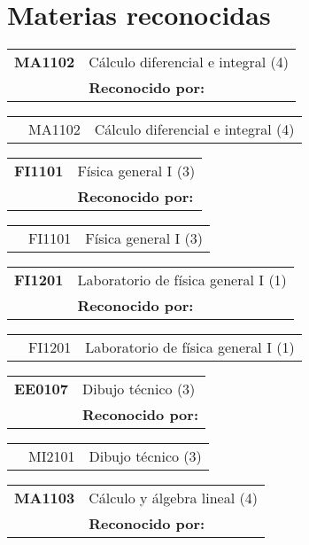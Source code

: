 \documentclass[letterpaper]{article}%
\begin{document}
\section*{Materias reconocidas}%
\label{sec:Materiasreconocidas}%
\vspace*{0.5cm}%
\begin{tabularx}{\textwidth}{p{1.5cm}p{10cm}}%
\textbf{MA1102}&Cálculo diferencial e integral (4)\\%
&\textbf{Reconocido por: }\\%
\end{tabularx}%
\begin{tabularx}{\textwidth}{p{1.5cm}p{1.5cm}p{10cm}}%
&MA1102&Cálculo diferencial e integral (4)\\%
\end{tabularx}%
\begin{tabularx}{\textwidth}{p{1.5cm}p{10cm}}%
\textbf{FI1101}&Física general I (3)\\%
&\textbf{Reconocido por: }\\%
\end{tabularx}%
\begin{tabularx}{\textwidth}{p{1.5cm}p{1.5cm}p{10cm}}%
&FI1101&Física general I (3)\\%
\end{tabularx}%
\begin{tabularx}{\textwidth}{p{1.5cm}p{10cm}}%
\textbf{FI1201}&Laboratorio de física general I (1)\\%
&\textbf{Reconocido por: }\\%
\end{tabularx}%
\begin{tabularx}{\textwidth}{p{1.5cm}p{1.5cm}p{10cm}}%
&FI1201&Laboratorio de física general I (1)\\%
\end{tabularx}%
\begin{tabularx}{\textwidth}{p{1.5cm}p{10cm}}%
\textbf{EE0107}&Dibujo técnico (3)\\%
&\textbf{Reconocido por: }\\%
\end{tabularx}%
\begin{tabularx}{\textwidth}{p{1.5cm}p{1.5cm}p{10cm}}%
&MI2101&Dibujo técnico (3)\\%
\end{tabularx}%
\begin{tabularx}{\textwidth}{p{1.5cm}p{10cm}}%
\textbf{MA1103}&Cálculo y álgebra lineal (4)\\%
&\textbf{Reconocido por: }\\%
\end{tabularx}%
\end{document}
